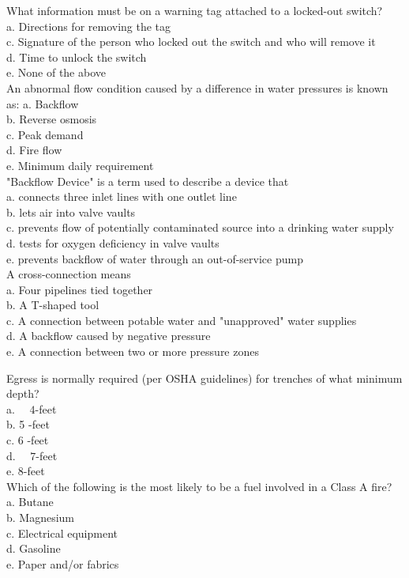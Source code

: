 What information must be on a warning tag attached to a locked-out switch?\\
a. Directions for removing the tag\\
c. Signature of the person who locked out the switch and who will remove it\\
d. Time to unlock the switch\\
e. None of the above\\

An abnormal flow condition caused by a difference in water pressures is known as:
a. Backflow\\
b. Reverse osmosis\\
c. Peak demand\\
d. Fire flow\\
e. Minimum daily requirement\\

"Backflow Device" is a term used to describe a device that\\
a. connects three inlet lines with one outlet line\\
b. lets air into valve vaults\\
c. prevents flow of potentially contaminated source into a drinking water supply\\
d. tests for oxygen deficiency in valve vaults\\
e. prevents backflow of water through an out-of-service pump\\

A cross-connection means\\
a. Four pipelines tied together\\
b. A T-shaped tool\\
c. A connection between potable water and "unapproved" water supplies\\
d. A backflow caused by negative pressure\\
e. A connection between two or more pressure zones 

Egress is normally required (per OSHA guidelines) for trenches of what minimum depth?\\
a. $\quad 4$-feet\\
b. 5 -feet\\
c. 6 -feet\\
d. $\quad 7$-feet\\
e. 8-feet\\

Which of the following is the most likely to be a fuel involved in a Class A fire?\\
a. Butane\\
b. Magnesium\\
c. Electrical equipment\\
d. Gasoline\\
e. Paper and/or fabrics\\

